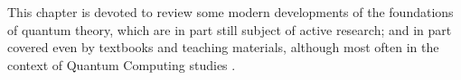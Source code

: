 This chapter is devoted to review some modern developments
of the foundations of quantum theory, which are in part
still subject of active research; and in part covered
even by textbooks and teaching materials, although
most often in the context of Quantum Computing studies
\parencite{PreskillNotes, Haroche_Exploring, Nakahara, NielsenChuang, open_systems}.